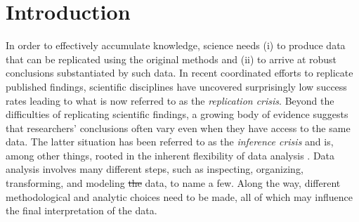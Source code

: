 \documentclass[Review,times,sageh]{sagej}
\providecommand{\DIFdeltex}[1]{{\protect\color{red}\sout{#1}}}                      %
\providecommand{\DIFdelbegin}{} %
\providecommand{\DIFdelend}{} %
\providecommand{\DIFdel}[1]{\texorpdfstring{\DIFdeltex{#1}}{}} %
\begin{document}
\hypertarget{introduction}{%
\section{Introduction}\label{introduction}}

In order to effectively accumulate knowledge, science needs (i) to produce data that can be replicated using the original methods and (ii) to arrive at robust conclusions substantiated by such data.
In recent coordinated efforts to replicate published findings, scientific disciplines have uncovered surprisingly low success rates \citep[e.g.,][]{open2015estimating, camerer2018evaluating} leading to what is now referred to as the \emph{replication crisis}.
Beyond the difficulties of replicating scientific findings, a growing body of evidence suggests that researchers' conclusions often vary even when they have access to the same data.
The latter situation has been referred to as the \emph{inference crisis} \citep{rotello2015more, starns2019assessing} and is, among other things, rooted in the inherent flexibility of data analysis \citep[often referred to as researcher degrees of freedom:][]{simmons2011false, gelman2014statistical}.
Data analysis involves many different steps, such as inspecting, organizing, transforming, and modeling \DIFdelbegin \DIFdel{the }\DIFdelend data, to name a few.
Along the way, different methodological and analytic choices need to be made, all of which may influence the final interpretation of the data.
\end{document}
